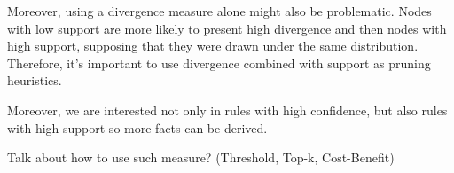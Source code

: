 
Moreover, using a divergence measure alone might also be problematic. Nodes with low support are more likely to present high divergence and then nodes with high support, supposing that they were drawn under the same distribution. Therefore, it's important to use divergence combined with support as pruning heuristics.

Moreover, we are interested not only in rules with high confidence, but also rules with high support so more facts can be derived.

Talk about how to use such measure? (Threshold, Top-k, Cost-Benefit)





